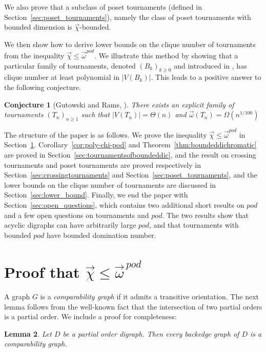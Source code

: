 \documentclass{article}
\newcommand{\dic}{\vec\chi}
\newcommand{\diomega}{\vec\omega}
\newtheorem{lemma}{Lemma}
\newtheorem{conj}[lemma]{Conjecture}
\begin{document}
We also prove that a subclass of poset tournaments (defined in Section~\ref{sec:poset_tournaments}), namely the class of poset tournaments with bounded dimension is $\dic$-bounded. 

We then show how to derive lower bounds on the clique number of tournaments from the inequality $\dic \leq \diomega^{pod}$. We illustrate this method by showing that a particular family of tournaments, denoted $(B_k)_{k \geq 0}$ and introduced in , has clique number at least polynomial in $|V(B_k)|$. This leads to a positive answer to the following conjecture. 

\begin{conj}[Gutowski and Rams, \cite{gutowski2026notecomplexitydirectedclique}]\label{conj:Gutowski}
   There exists an explicit family of tournaments $(T_n)_{n\ge 1}$ such that $|V(T_n)|=\Theta(n)$ and $\diomega(T_n)=\Omega(n^{1/100})$  
\end{conj}


The structure of the paper is as follows. We prove the inequality $\dic \leq \diomega^{pod}$ in Section~\ref{sec:main_eq}. Corollary~\ref{cor:poly-chi-pod} and Theorem~\ref{thm:boundeddichromatic} are proved in Section~\ref{sec:tournamentsofboundeddic}, and the result on crossing tournaments and poset tournaments are  proved respectively in Section~\ref{sec:crossingtournaments} and Section~\ref{sec:poset_tournaments}, and the lower bounds on the clique number of tournaments are discussed in Section~\ref{sec:lower_bound}. Finally, we end the paper with Section~\ref{sec:open_questions}, which contains two additional short results on $pod$ and a few open questions on tournaments and $pod$. The two results show that acyclic digraphs can have arbitrarily large $pod$, and that tournaments with bounded $pod$ have bounded domination number.

\section{Proof that $\dic \leq \diomega^{\,pod}$}\label{sec:main_eq}

A graph $G$ is a \textit{comparability graph} if it admits a transitive orientation.  
The next lemma follows from the well-known fact that the intersection of two partial orders is a partial order. We include a proof for completeness: 

\begin{lemma}\label{lem:compgraphbackedge}
Let $D$ be a partial order digraph. Then every backedge graph of $D$ is a comparability graph.
\end{lemma}
\end{document}
